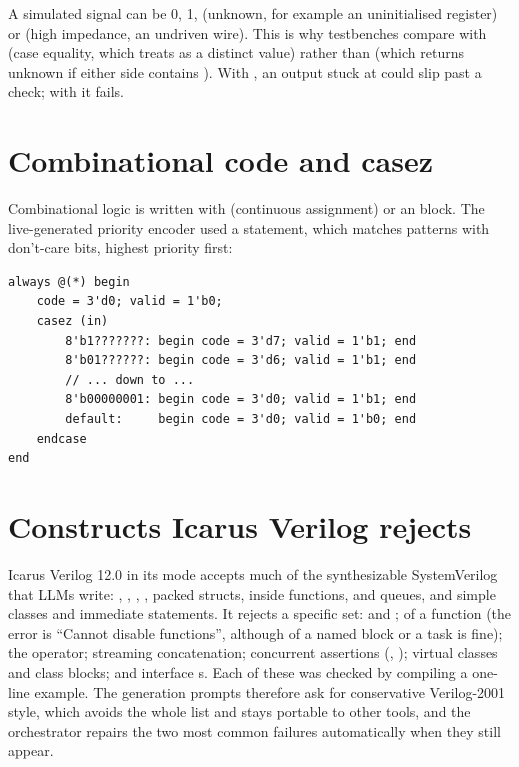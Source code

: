 A simulated signal can be 0, 1,  (unknown, for example an uninitialised register) or  (high impedance, an undriven wire). This is why testbenches compare with \code{===} (case equality, which treats  as a distinct value) rather than \code{==} (which returns unknown if either side contains ). With \code{==}, an output stuck at  could slip past a check; with \code{===} it fails.

\section{Combinational code and casez}

Combinational logic is written with  (continuous assignment) or an  block. The live-generated priority encoder used a  statement, which matches patterns with don't-care bits, highest priority first:

\begin{lstlisting}
always @(*) begin
    code = 3'd0; valid = 1'b0;
    casez (in)
        8'b1???????: begin code = 3'd7; valid = 1'b1; end
        8'b01??????: begin code = 3'd6; valid = 1'b1; end
        // ... down to ...
        8'b00000001: begin code = 3'd0; valid = 1'b1; end
        default:     begin code = 3'd0; valid = 1'b0; end
    endcase
end
\end{lstlisting}

\section{Constructs Icarus Verilog rejects}

Icarus Verilog 12.0 in its  mode accepts much of the synthesizable SystemVerilog that LLMs write: , , , , packed structs,  inside functions,  and queues, and simple classes and immediate  statements. It rejects a specific set:  and ;  of a function (the error is ``Cannot disable functions'', although  of a named block or a task is fine); the  operator; streaming concatenation; concurrent assertions (, ); virtual classes and class  blocks; and interface s. Each of these was checked by compiling a one-line example. The generation prompts therefore ask for conservative Verilog-2001 style, which avoids the whole list and stays portable to other tools, and the orchestrator repairs the two most common failures automatically when they still appear.

